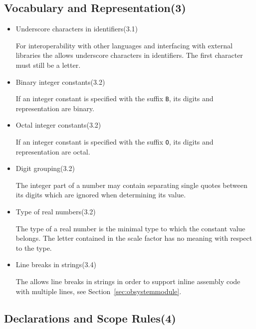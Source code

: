 \newcommand{\obref}[1]{\alignright(#1)\nopagebreak}
\newcommand{\obsection}[2]{\subsection[#1]{#1\alignright(#2)}}

\obsection{Vocabulary and Representation}{3}

\begin{itemize}

\item Underscore characters in identifiers\obref{3.1}

For interoperability with other languages and interfacing with external libraries the \ecs{} allows underscore characters in identifiers.
The first character must still be a letter.

\item Binary integer constants\obref{3.2}

If an integer constant is specified with the suffix \texttt{B}, its digits and representation are binary.

\item Octal integer constants\obref{3.2}

If an integer constant is specified with the suffix \texttt{O}, its digits and representation are octal.

\item Digit grouping\obref{3.2}

The integer part of a number may contain separating single quotes between its digits which are ignored when determining its value.

\item Type of real numbers\obref{3.2}

The type of a real number is the minimal type to which the constant value belongs.
The letter contained in the scale factor has no meaning with respect to the type.

\item Line breaks in strings\obref{3.4}

The \ecs{} allows line breaks in strings in order to support inline assembly code with multiple lines, see Section~\ref{sec:obsystemmodule}.

\end{itemize}

\obsection{Declarations and Scope Rules}{4}\label{sec:obdeclarations}

